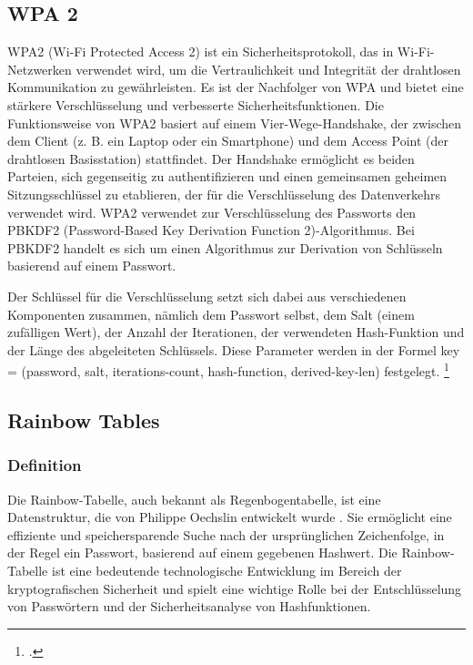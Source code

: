 \subsection{WPA 2}
WPA2 (Wi-Fi Protected Access 2) ist ein Sicherheitsprotokoll, das in Wi-Fi-Netzwerken verwendet wird, um die Vertraulichkeit und Integrität der drahtlosen Kommunikation zu gewährleisten. 
Es ist der Nachfolger von WPA und bietet eine stärkere Verschlüsselung und verbesserte Sicherheitsfunktionen.
Die Funktionsweise von WPA2 basiert auf einem Vier-Wege-Handshake, der zwischen dem Client (z. B. ein Laptop oder ein Smartphone) und dem Access Point (der drahtlosen Basisstation) stattfindet. 
Der Handshake ermöglicht es beiden Parteien, sich gegenseitig zu authentifizieren und einen gemeinsamen geheimen Sitzungsschlüssel zu etablieren, der für die Verschlüsselung des Datenverkehrs verwendet wird.
WPA2 verwendet zur Verschlüsselung des Passworts den PBKDF2 (Password-Based Key Derivation Function 2)-Algorithmus. Bei PBKDF2 handelt es sich um einen Algorithmus zur Derivation von Schlüsseln basierend auf einem Passwort.

Der Schlüssel für die Verschlüsselung setzt sich dabei aus verschiedenen Komponenten zusammen, nämlich dem Passwort selbst, dem Salt (einem zufälligen Wert), der Anzahl der Iterationen, der verwendeten Hash-Funktion und der Länge des abgeleiteten Schlüssels.
Diese Parameter werden in der Formel key = (password, salt, iterations-count, hash-function, derived-key-len) festgelegt. \footcite{PBKDF2}
\subsection{Rainbow Tables}
\subsubsection{Definition}
Die Rainbow-Tabelle, auch bekannt als Regenbogentabelle, ist eine Datenstruktur, die von Philippe Oechslin entwickelt wurde \cite{Rainbow}. 
Sie ermöglicht eine effiziente und speichersparende Suche nach der ursprünglichen Zeichenfolge, in der Regel ein Passwort, basierend auf einem gegebenen Hashwert. 
Die Rainbow-Tabelle ist eine bedeutende technologische Entwicklung im Bereich der kryptografischen Sicherheit und spielt eine wichtige Rolle bei der Entschlüsselung von Passwörtern und der Sicherheitsanalyse von Hashfunktionen.
